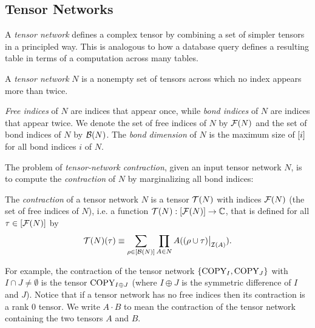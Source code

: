 \subsection{Tensor Networks}
\label{sec:tensors:tensors:tensor-networks}
A \emph{tensor network} defines a complex tensor by combining a set of simpler tensors in a principled way. This is analogous to how a database query defines a resulting table in terms of a computation across many tables.

\begin{definition}
	\label{def:tensor-contraction-network}
	A \emph{tensor network} $N$ is a nonempty set of tensors across which no index appears more than twice.
\end{definition}

\emph{Free indices} of $N$ are indices that appear once, while \emph{bond indices} of $N$ are indices that appear twice. We denote the set of free indices of $N$ by $\mathcal{F}(N)$ and the set of bond indices of $N$ by $\mathcal{B}(N)$. The \emph{bond dimension} of $N$ is the maximum size of $[i]$ for all bond indices $i$ of $N$.

The problem of \emph{tensor-network contraction}, given an input tensor network $N$, is to compute the \emph{contraction} of $N$ by marginalizing all bond indices:
\begin{definition}\label{def:contraction}
The \emph{contraction} of a tensor network $N$ is a tensor $\mathcal{T}(N)$ with indices $\mathcal{F}(N)$ (the set of free indices of $N$), i.e. a function $\mathcal{T}(N) : [\mathcal{F}(N)] \rightarrow \mathbb{C}$, that is defined for all $\tau \in [\mathcal{F}(N)]$ by
		\begin{equation}
        \label{eqn:contraction} 
        \mathcal{T}(N)(\tau) \equiv \sum_{\rho \in [\mathcal{B}(N)]} \prod_{A \in N} A((\rho \cup \tau)\big|_{\mathcal{I}(A)}).
        \end{equation}
\end{definition}

For example, the contraction of the tensor network $\{\text{COPY}_I, \text{COPY}_J\}$ with $I \cap J \neq \emptyset$ is the tensor $\text{COPY}_{I \oplus J}$ (where $I \oplus J$ is the symmetric difference of $I$ and $J$). Notice that if a tensor network has no free indices then its contraction is a rank 0 tensor. We write $A \cdot B$ to mean the contraction of the tensor network containing the two tensors $A$ and $B$. 

